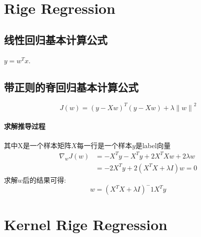 \documentclass[UTF8]{ctexart}
\begin{document}
    \section{Rige Regression} 
        \subsection{线性回归基本计算公式} $y=w^Tx$.
        \subsection{带正则的脊回归基本计算公式} 
        \begin{equation}
        J(w) = (y-Xw)^T(y-Xw) + \lambda{\parallel{w}\parallel}^2
        \end{equation}
        \paragraph{求解推导过程}
        其中X是一个样本矩阵$X$每一行是一个样本$y$是label向量
        \begin{equation}
        \begin{aligned}
          \nabla _w J(w) & = -X^Ty-X^Ty+2X^TXw+2\lambda w \\
          & =-2X^Ty+2(X^TX+\lambda I)w = 0
        \end{aligned}
        \end{equation}
        求解$w$后的结果可得:
        \begin{equation}
        w = (X^TX+\lambda I)^-1X^Ty
        \end{equation}
        
    \section{Kernel Rige Regression}
\end{document}

